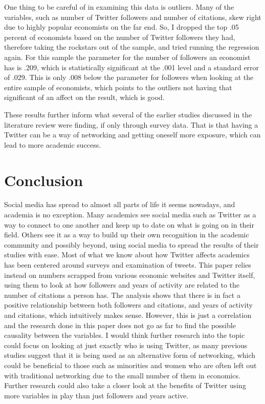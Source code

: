 \documentclass[12pt, Times New Roman]{article}
\begin{document}
One thing to be careful of in examining this data is outliers. Many of the variables, such as number of Twitter followers and number of citations, skew right due to highly popular economists on the far end. So, I dropped the top .05 percent of economists based on the number of Twitter followers they had, therefore taking the rockstars out of the sample, and tried running the regression again. For this sample the parameter for the number of followers an economist has is .209, which is statistically significant at the .001 level and a standard error of .029. This is only .008 below the parameter for followers when looking at the entire sample of economists, which points to the outliers not having that significant of an affect on the result, which is good. 

These results further inform what several of the earlier studies discussed in the literature review were finding, if only through survey data. That is that having a Twitter can be a way of networking and getting oneself more exposure, which can lead to more academic success. 

\section*{Conclusion}\label{sec:conclusion}

Social media has spread to almost all parts of life it seems nowadays, and academia is no exception. Many academics see social media such as Twitter as a way to connect to one another and keep up to date on what is going on in their field. Others see it as a way to build up their own recognition in the academic community and possibly beyond, using social media to spread the results of their studies with ease. Most of what we know about how Twitter affects academics has been centered around surveys and examination of tweets. This paper relies instead on numbers scrapped from various economic websites and Twitter itself, using them to look at how followers and years of activity are related to the number of citations a person has. The analysis shows that there is in fact a positive relationship between both followers and citations, and years of activity and citations, which intuitively makes sense. However, this is just a correlation and the research done in this paper does not go as far to find the possible causality between the variables. I would think further research into the topic could focus on looking at just exactly who is using Twitter, as many previous studies suggest that it is being used as an alternative form of networking, which could be beneficial to those such as minorities and women who are often left out with traditional networking due to the small number of them in economics. Further research could also take a closer look at the benefits of Twitter using more variables in play than just followers and years active. 
\end{document}
